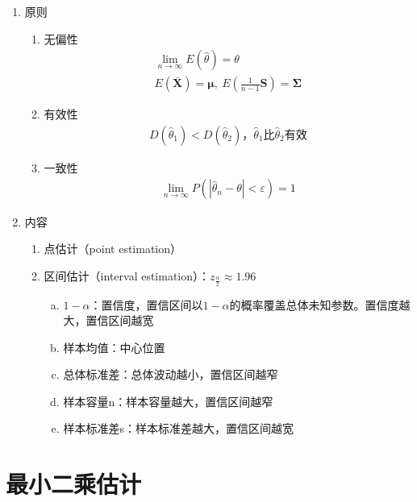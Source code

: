 \documentclass[12pt]{book}
\begin{document}
\begin{enumerate}[1.]
    \item 原则
          \begin{enumerate}[(1)]
              \item 无偏性
                    \begin{gather*}
                        \lim_{n→\infty}{E(\hat{\theta})=\theta } \\
                        E\left(\overline{\bm{X}}\right)=\bm{\mu},\ E\left(\frac{1}{n-1}\bm{S}\right)=\bm{\Sigma}
                    \end{gather*}
              \item 有效性
                    \begin{gather*}
                        D(\hat{\theta}_1)<D(\hat{\theta}_2)，\hat{\theta}_1比\hat{\theta}_2有效
                    \end{gather*}
              \item 一致性
                    \begin{gather*}
                        \lim_{n\rightarrow\infty}{P\left({\left|{\hat{\theta}}_n-\theta\right|<\varepsilon}\right)}=1
                    \end{gather*}
          \end{enumerate}
    \item 内容
          \begin{enumerate}[(1)]
              \item 点估计（point estimation）
              \item 区间估计（interval estimation）：$z_{\frac{\alpha}{2}}\approx 1.96$
                    \begin{enumerate}[a.]
                        \item $1-\alpha$：置信度，置信区间以$1-\alpha$的概率覆盖总体未知参数。置信度越大，置信区间越宽
                        \item 样本均值：中心位置
                        \item 总体标准差：总体波动越小，置信区间越窄
                        \item 样本容量n：样本容量越大，置信区间越窄
                        \item 样本标准差s：样本标准差越大，置信区间越宽
                    \end{enumerate}
          \end{enumerate}
\end{enumerate}


\section{最小二乘估计}
\end{document}
